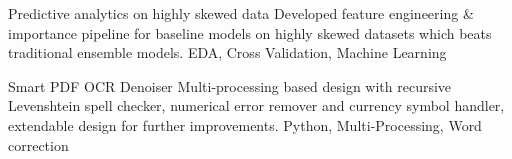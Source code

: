 \begin{projects}
	\project
	{Predictive analytics on highly skewed data}{}
	{  }
	{Developed feature engineering \& importance pipeline for baseline models on highly skewed datasets which beats traditional ensemble models.}
	{EDA, Cross Validation, Machine Learning}
	
	\project
	{Smart PDF OCR Denoiser}{}
	{  }
	{Multi-processing based design with recursive Levenshtein spell checker, numerical error
remover and currency symbol handler, extendable design for further improvements.}
	{Python, Multi-Processing, Word correction}
	\fi
\end{projects}